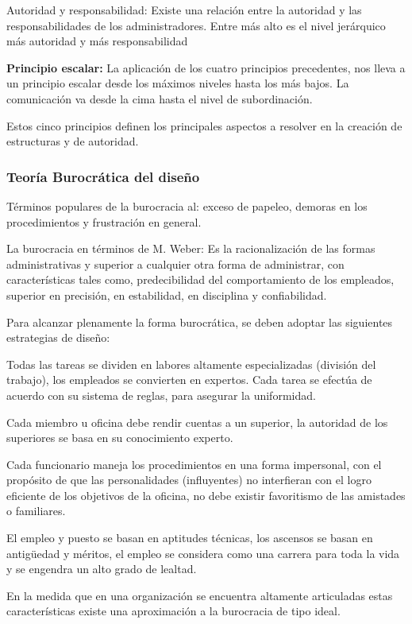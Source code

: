 Autoridad y responsabilidad: Existe una relación entre la autoridad y las responsabilidades de los administradores. Entre más alto es el nivel jerárquico más autoridad y más responsabilidad

\textbf{Principio escalar:} La aplicación de los cuatro principios precedentes, nos lleva a un principio escalar desde los máximos niveles hasta los más bajos. La comunicación va desde la cima hasta el nivel de subordinación.

Estos cinco principios definen los principales aspectos a resolver en la creación de estructuras y de autoridad.

\subsubsection{Teoría Burocrática del diseño}

Términos populares de la burocracia al: exceso de papeleo, demoras en los procedimientos y frustración en general.

La burocracia en términos de M. Weber: Es la racionalización de las formas administrativas y superior a cualquier otra forma de administrar, con características tales como, predecibilidad del comportamiento de los empleados, superior en precisión, en estabilidad, en disciplina y confiabilidad.

Para alcanzar plenamente la forma burocrática, se deben adoptar las siguientes estrategias de diseño:

Todas las tareas se dividen en labores altamente especializadas (división del trabajo), los empleados se convierten en expertos. Cada tarea se efectúa de acuerdo con su sistema de reglas, para asegurar la uniformidad.

Cada miembro u oficina debe rendir cuentas a un superior, la autoridad de los superiores se basa en su conocimiento experto.

Cada funcionario maneja los procedimientos en una forma impersonal, con el propósito de que las personalidades (influyentes) no interfieran con el logro eficiente de los objetivos de la oficina, no debe existir favoritismo de las amistades o familiares.

El empleo y puesto se basan en aptitudes técnicas, los ascensos se basan en antigüedad y méritos, el empleo se considera como una carrera para toda la vida y se engendra un alto grado de lealtad.

En la medida que en una organización se encuentra altamente articuladas estas características existe una aproximación a la burocracia de tipo ideal.

